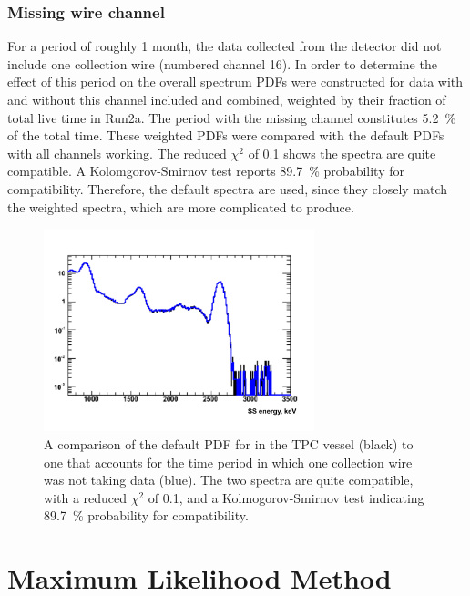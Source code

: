 \documentclass[herrin-thesis.tex]{subfiles}
\begin{document}
\subsubsection{Missing wire channel}
For a period of roughly 1 month, the data collected from the detector did not include one collection wire (numbered channel 16). In order to determine the effect of this period on the overall spectrum PDFs were constructed for data with and without this channel included and combined, weighted by their fraction of total live time in Run2a. The period with the missing channel constitutes \SI{5.2}{\percent} of the total time. These weighted PDFs were compared with the default PDFs with all channels working. The reduced \(\chi^2\) of 0.1 shows the spectra are quite compatible. A Kolomgorov-Smirnov test reports \SI{89.7}{\percent} probability for compatibility. Therefore, the default spectra are used, since they closely match the weighted spectra, which are more complicated to produce.

\begin{figure}[htb]
\centering
\includegraphics[width=0.7\textwidth]{./plots/analysis_missing_channel16_comparison.pdf}
\caption[Comparison of default PDF to PDF with missing channel]{A comparison of the default PDF for  in the TPC vessel (black) to one that accounts for the time period in which one collection wire was not taking data (blue). The two spectra are quite compatible, with a reduced \(\chi^2\) of 0.1, and a Kolmogorov-Smirnov test indicating \SI{89.7}{\percent} probability for compatibility.}
\label{fig:analysis_missing_channel16_comparison}
\end{figure}

\section{Maximum Likelihood Method}
\end{document}
